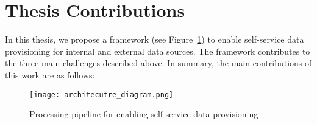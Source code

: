 \section{Thesis Contributions} \label{sec:contribution}

In this thesis, we propose a framework (see Figure~\ref{fig:architecutre_diagram}) to enable self-service data provisioning for internal and external data sources. The framework contributes to the three main challenges described above. In summary, the main contributions of this work are as follows:

\begin{figure}[!ht]
  \centering
  \texttt{[image: architecutre\_diagram.png]}
  \caption{Processing pipeline for enabling self-service data provisioning}
  \label{fig:architecutre_diagram}
\end{figure}

